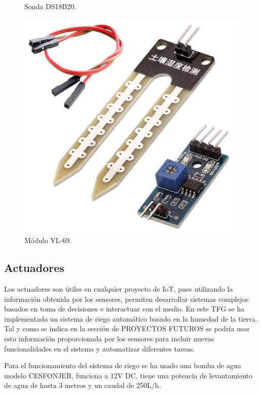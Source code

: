 \documentclass[a4paper, 12pt, oneside]{book}
\begin{document}
\begin{figure}[H]
\begin{minipage}[b]{0.4\textwidth}
    \caption{Sonda DS18B20.}
    \label{figura:sonda_ds18b20}
  \end{minipage}
  \hfill
    \begin{minipage}[b]{0.4\textwidth}
    \includegraphics[width=\textwidth]{img/yl-69}
    \caption{Módulo YL-69.}
    \label{figura:yl_69}
  \end{minipage}
\end{figure}

\subsection{Actuadores}
\label{subsec:actuadores}

Los actuadores son útiles en cualquier proyecto de IoT, pues utilizando la información obtenida por los sensores, permiten desarrollar sistemas complejos basados en toma de decisiones e interactuar con el medio. 
En este TFG se ha implementado un sistema de riego automático basado en la humedad de la tierra. Tal y como se indica en la sección de PROYECTOS FUTUROS se podría usar esta información proporcionada por los sensores para incluir nuevas funcionalidades en el sistema y automatizar diferentes tareas.

Para el funcionamiento del sistema de riego se ha usado una bomba de agua modelo CESFONJER, funciona a 12V DC, tiene una potencia de levantamiento de agua de hasta 3 metros y un caudal de 250L/h.
\end{document}
